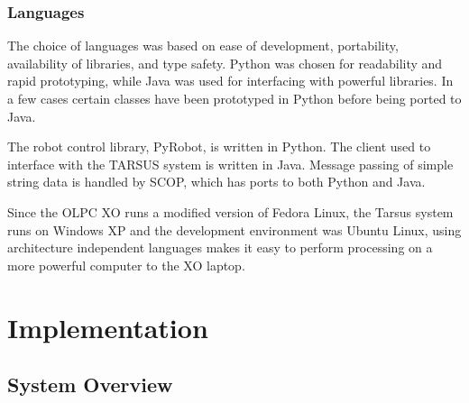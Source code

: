 \documentclass[12pt,a4,notitlepage]{report}
\renewcommand{\_}{\texttt{\symbol{95}}}
\newcommand{\<}{\texttt{\symbol{60}}}
\renewcommand{\>}{\texttt{\symbol{62}}}
\begin{document}
\subsection{Languages}

The choice of languages was based on ease of development, portability, availability of libraries, and type safety. Python was chosen for readability and rapid prototyping, while Java was used for interfacing with powerful libraries. In a few cases certain classes have been prototyped in Python before being ported to Java.

The robot control library, PyRobot, is written in Python. The client\cite{bodyPaint} used to interface with the TARSUS system is written in Java. Message passing of simple string data is handled by SCOP, which has ports to both Python and Java.

Since the OLPC XO runs a modified version of Fedora Linux, the Tarsus system runs on Windows XP and the development environment was Ubuntu Linux, using architecture independent languages makes it easy to perform processing on a more powerful computer to the XO laptop.

\chapter{Implementation}

\section{System Overview}
\end{document}
